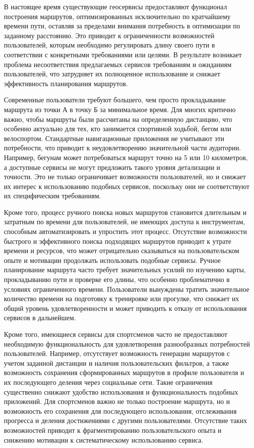 В настоящее время существующие геосервисы предоставляют функционал построения маршрутов, оптимизированных исключительно по кратчайшему времени пути, оставляя за пределами внимания потребность в оптимизации по заданному расстоянию. Это приводит к ограниченности возможностей пользователей, которым необходимо регулировать длину своего пути в соответствии с конкретными требованиями или целями. В результате возникает проблема несоответствия предлагаемых сервисов требованиям и ожиданиям пользователей, что затрудняет их полноценное использование и снижает эффективность планирования маршрутов.

Современные пользователи требуют большего, чем просто прокладывание маршрута из точки А в точку Б за минимальное время. Для многих критично важно, чтобы маршруты были рассчитаны на определенную дистанцию, что особенно актуально для тех, кто занимается спортивной ходьбой, бегом или велоспортом. Стандартные навигационные приложения не учитывают эти потребности, что приводит к неудовлетворению значительной части аудитории. Например, бегунам может потребоваться маршрут точно на 5 или 10 километров, а доступные сервисы не могут предложить такого уровня детализации и точности. Это не только ограничивает возможности пользователей, но и снижает их интерес к использованию подобных сервисов, поскольку они не соответствуют их специфическим требованиям.

Кроме того, процесс ручного поиска новых маршрутов становится длительным и затратным по времени для пользователей, не имеющих доступа к инструментам, способным автоматизировать и упростить этот процесс. Отсутствие возможности быстрого и эффективного поиска подходящих маршрутов приводит к утрате времени и ресурсов, что может отрицательно сказываться на пользовательском опыте и мотивации продолжать использовать подобные сервисы. Ручное планирование маршрута часто требует значительных усилий по изучению карты, прокладыванию пути и проверке его длины, что особенно проблематично в условиях ограниченного времени. Пользователи вынуждены тратить значительное количество времени на подготовку к тренировке или прогулке, что снижает их общий уровень удовлетворенности и может приводить к отказу от использования сервисов в дальнейшем.

Кроме того, имеющиеся сервисы для спортсменов часто не предоставляют необходимую функциональность для удовлетворения разнообразных потребностей пользователей. Например, отсутствует возможность генерации маршрутов с учетом заданной дистанции и наличия пользовательских фильтров, а также возможность сохранения сформированных маршрутов в профиле пользователя и их последующего деления через социальные сети. Такие ограничения существенно снижают удобство использования и функциональность подобных приложений. Для спортсменов важно не только построение маршрута, но и возможность его сохранения для последующего использования, отслеживания прогресса и деления достижениями с другими пользователями. Отсутствие таких возможностей приводит к фрагментированию пользовательского опыта и снижению мотивации к систематическому использованию сервиса.

